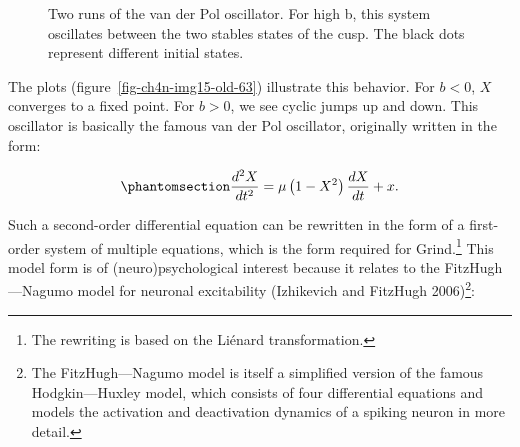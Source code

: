 \documentclass[
  a4paper,
  DIV=11,
  numbers=noendperiod,
  oneside]{scrreprt}
\begin{document}
\begin{figure}


\caption{\label{fig-ch4n-img14-old-62}Two runs of the van der Pol
oscillator. For high b, this system oscillates between the two stables
states of the cusp. The black dots represent different initial states.}

\end{figure}%

The plots (figure~\ref{fig-ch4n-img15-old-63}) illustrate this behavior.
For \(b < 0\), \(X\) converges to a fixed point. For \(b > 0\), we see
cyclic jumps up and down. This oscillator is basically the famous van
der Pol oscillator, originally written in the form:

\begin{equation}\phantomsection\label{eq-ch4n-15-old-35}{
\frac{d^{2}X}{dt^{2}} = \mu\left( 1 - X^{2} \right)\frac{dX}{dt} + x.
}\end{equation}

Such a second-order differential equation can be rewritten in the form
of a first-order system of multiple equations, which is the form
required for Grind.\footnote{The rewriting is based on the Liénard
  transformation.} This model form is of (neuro)psychological interest
because it relates to the FitzHugh---Nagumo model for neuronal
excitability (Izhikevich and FitzHugh 2006)\footnote{The
  FitzHugh---Nagumo model is itself a simplified version of the famous
  Hodgkin---Huxley model, which consists of four differential equations
  and models the activation and deactivation dynamics of a spiking
  neuron in more detail.}:
\end{document}
